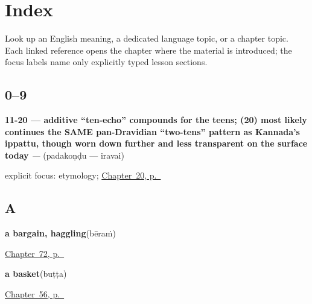 
\chapter*{Index}

Look up an English meaning, a dedicated language topic, or a chapter topic. Each linked reference opens the chapter where the material is introduced; the focus labels name only explicitly typed lesson sections.

\section*{0--9}

\noindent\begin{minipage}[t]{\linewidth}
\raggedright
\textbf{11-20 — additive \textquotedblleft{}ten-echo\textquotedblright{} compounds for the teens;  (20) most likely continues the SAME pan-Dravidian \textquotedblleft{}two-tens\textquotedblright{} pattern as Kannada's ippattu, though worn down further and less transparent on the surface today}\enspace\emph{ — }\enspace(padakoṇḍu — iravai)\par
\footnotesize explicit focus: etymology; \hyperref[ch:te-numbers-and-weather]{Chapter~20, p.~\pageref*{ch:te-numbers-and-weather}}
\end{minipage}\par\smallskip

\section*{A}

\noindent\begin{minipage}[t]{\linewidth}
\raggedright
\textbf{a bargain, haggling}\enspace\emph{}\enspace(bēraṁ)\par
\footnotesize \hyperref[ch:te-the-market]{Chapter~72, p.~\pageref*{ch:te-the-market}}
\end{minipage}\par\smallskip

\noindent\begin{minipage}[t]{\linewidth}
\raggedright
\textbf{a basket}\enspace\emph{}\enspace(buṭṭa)\par
\footnotesize \hyperref[ch:te-house]{Chapter~56, p.~\pageref*{ch:te-house}}
\end{minipage}\par\smallskip

